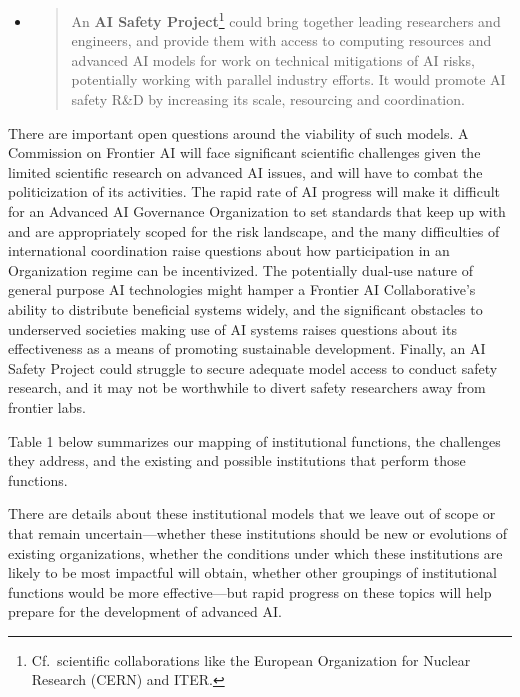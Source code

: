 \documentclass[12pt]{article}
\begin{document}
\begin{itemize}
\item
  \begin{quote}
  An \textbf{AI Safety Project}\footnote{Cf.\ scientific collaborations
    like the European Organization for Nuclear Research (CERN) and 
    ITER.} could bring together leading researchers and
  engineers, and provide them with access to computing resources and
  advanced AI models for work on technical mitigations of AI risks,
  potentially working with parallel industry efforts. It would promote
  AI safety R\&D by increasing its scale, resourcing and coordination.
  \end{quote}
\end{itemize}

There are important open questions around the viability of such models.
A Commission on Frontier AI will face significant scientific challenges
given the limited scientific research on advanced AI issues, and will
have to combat the politicization of its activities. The rapid rate of
AI progress will make it difficult for an Advanced AI Governance
Organization to set standards that keep up with and are appropriately
scoped for the risk landscape, and the many difficulties of
international coordination raise questions about how participation in an
Organization regime can be incentivized. The potentially dual-use nature
of general purpose AI technologies might hamper a Frontier AI
Collaborative's ability to distribute beneficial systems widely, and the
significant obstacles to underserved societies making use of AI systems
raises questions about its effectiveness as a means of promoting
sustainable development. Finally, an AI Safety Project could struggle to
secure adequate model access to conduct safety research, and it may not
be worthwhile to divert safety researchers away from frontier labs.

Table 1 below summarizes our mapping of institutional functions, the
challenges they address, and the existing and possible institutions that
perform those functions.

There are details about these institutional models that we leave out of
scope or that remain uncertain---whether these institutions should be
new or evolutions of existing organizations, whether the conditions
under which these institutions are likely to be most impactful will
obtain, whether other groupings of institutional functions would be more
effective---but rapid progress on these topics will help prepare for the
development of advanced AI.
\end{document}
